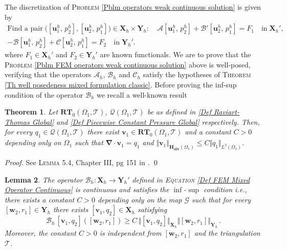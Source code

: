 \documentclass[3p]{elsarticle}
\newtheorem{theorem}{Theorem}
\newtheorem{lemma}[theorem]{Lemma}
\def\A{{\mathcal A}}
\def\B{{\mathcal B}}
\def\C{{\mathcal C}}
\def\X{\mathbf X}
\def\Y{\mathbf Y}
\def\div{\bm{\nabla} \cdot}
\def\uoneh{\mathbf{u}_{1}^{h}}
\def\utwoh{\mathbf{u}_{2}^{h}}
\def\Hdiv{\mathbf{H_{div}}}
\def\wtwo{\mathbf{w}_{2}}
\def\vone{\mathbf{v}_{1}}
\def\qone{q_{1}}
\def\qtwo{q_{2}}
\def\rone{r_{1}}
\def\poneh{p_{1}^{h}}
\def\ptwoh{p_{2}^{h}}
\def\triang{\mathcal{T}}
\def\map{\mathcal{G} }%
\begin{document}
%
%
%
The discretization of \textsc{Problem} \eqref{Pblm operators weak continuous solution} is given by 
%
%
\begin{equation}\label{Pblm FEM operators weak continuous solution}
%
\begin{split}
\text{Find a pair}\; 
\big([\uoneh,\,\ptwoh], [\utwoh,\,\poneh]\big)\in \X_{h}\times \Y_{h}: \quad 
\A[\uoneh,\,\ptwoh] + \B ' [\utwoh,\,\poneh]  = F_{1}\quad \text{in}\; \X_{h} ' ,\\
%
- \B [\uoneh,\,\ptwoh]  + \C [\utwoh,\,\poneh] = F_{2} \quad \text{in}\; \Y_{h} ' .
\end{split}
%
\end{equation}
%
%
where $F_{1}\in \X_{h} '$ and $F_{2} \in \Y_{h} '$ are known functionals. We are to prove that the \textsc{Problem} \eqref{Pblm FEM operators weak continuous solution} above is well-posed, verifying that the operators $\A_{h}$, $\B_{h}$ and $\C_{h}$ satisfy the hypotheses of \textsc{Theorem} \ref{Th well posedeness mixed formulation classic}.
%
%
Before proving the inf-sup condition of the operator $\B_{h}$ we recall a well-known result
%
%
\begin{theorem}\label{Th Local Solution of the Dual Formulation}
Let $\mathbf{RT}_{0}(\Omega_{1}, \triang)$, $\mathcal{Q}(\Omega_{1}, \triang)$ be as defined in \eqref{Def Raviart-Thomas Global} and \eqref{Def Piecewise Constant Pressure Global} respectively. Then, for every $\qone \in \mathcal{Q}(\Omega_{1}, \triang)$ there exist $\vone\in \mathbf{RT}_{0}(\Omega_{1}, \triang)$ and a constant $C>0$ depending only on $\Omega_{1}$ such that $\div \vone = \qone$ and $\Vert \vone \Vert_{\Hdiv(\Omega_{1})} \leq C \Vert \qone \Vert_{L^{2}(\Omega_{1})}$.
%
\end{theorem}
%
\begin{proof}
See \textsc{Lemma} 5.4, Chapter III, pg 151 in \cite{BraessFEM}.
%
\qed
\end{proof}
%
%
%
\begin{lemma}\label{Th FEM inf sup condition}
The operator $\B_{h}: \X_{h} \rightarrow \Y_{h} '$ defined in \textsc{Equation} \eqref{Def FEM Mixed Operator Continuous} is continuous and satisfies the $\inf$-$\sup$ condition i.e., there exists a constant $C>0$ depending only on the map $\map$ such that for every $[\wtwo, \rone]\in\Y_{h} $ there exists $[\vone, \qtwo]\in\X_{h}$ satisfying
%
\begin{equation}\label{Ineq FEM existence of beta}
 \B_{h}\,[\vone, \qtwo] ([\wtwo, \rone])\geq 
C\, \big\Vert [\vone, \qtwo]\big\Vert_{\X_{h}} \big\Vert [\wtwo, \rone] \big\Vert_{\Y_{h}}
\, .
\end{equation}
%
Moreover, the constant $C>0$ is independent from $[\wtwo, \rone]$ and the triangulation $\triang$.
\end{lemma}
\end{document}
